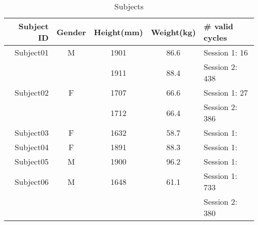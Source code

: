 \begin{table}[ht!]
    \centering
    \caption{Subjects }
    \label{tab:subject-table}
    \small
    \begin{tabular}{r | c c c | l}
        Subject ID  & Gender    & Height(mm)   & Weight(kg)     & \# valid cycles\\ \hline
        Subject01   & M         & 1901          & 86.6          & Session 1: 16 \\
                    &           & 1911          & 88.4          & Session 2: 438 \\ \hline
        Subject02   & F         & 1707          & 66.6          & Session 1: 27 \\
                    &           & 1712          & 66.4          & Session 2: 386 \\ \hline
        Subject03   & F         & 1632          & 58.7          & Session 1: \\ \hline
        Subject04   & F         & 1891          & 88.3          & Session 1: \\ \hline
        Subject05   & M         & 1900          & 96.2          & Session 1: \\ \hline
        Subject06   & M         & 1648          & 61.1          & Session 1: 733 \\
                    &           &               &               & Session 2: 380 \\ \hline
    \end{tabular}
\end{table}
